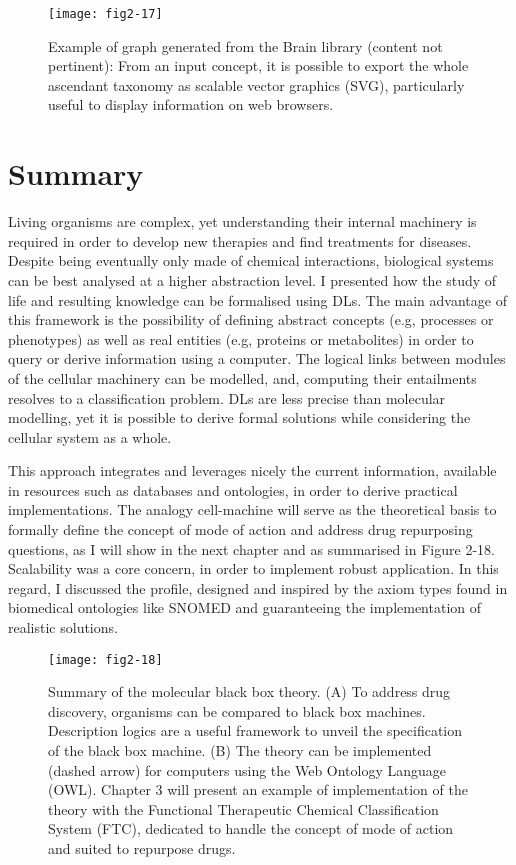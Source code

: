 \begin{figure}[ht]
    \centering
    \texttt{[image: fig2-17]}
    \caption{Example of graph generated from the Brain library (content not pertinent): From an input concept, it is possible to export the whole ascendant taxonomy as scalable vector graphics (SVG), particularly useful to display information on web browsers.}
    \label{fig2-17}
\end{figure}

\section{Summary}

Living organisms are complex, yet understanding their internal machinery is required in order to develop new therapies and find treatments for diseases. Despite being eventually only made of chemical interactions, biological systems can be best analysed at a higher abstraction level. I presented how the study of life and resulting knowledge can be formalised using DLs. The main advantage of this framework is the possibility of defining abstract concepts (e.g, processes or phenotypes) as well as real entities (e.g, proteins or metabolites) in order to query or derive information using a computer. The logical links between modules of the cellular machinery can be modelled, and, computing their entailments resolves to a classification problem. DLs are less precise than molecular modelling, yet it is possible to derive formal solutions while considering the cellular system as a whole.

This approach integrates and leverages nicely the current information, available in resources such as databases and ontologies, in order to derive practical implementations. The analogy cell-machine will serve as the theoretical basis to formally define the concept of mode of action and address drug repurposing questions, as I will show in the next chapter and as summarised in Figure 2-18. Scalability was a core concern, in order to implement robust application. In this regard, I discussed the  profile, designed and inspired by the axiom types found in biomedical ontologies like SNOMED and guaranteeing the implementation of realistic solutions.

\begin{figure}[ht]
    \centering
    \texttt{[image: fig2-18]}
    \caption{Summary of the molecular black box theory. (A) To address drug discovery, organisms can be compared to black box machines. Description logics are a useful framework to unveil the specification of the black box machine. (B) The theory can be implemented (dashed arrow) for computers using the Web Ontology Language (OWL). Chapter 3 will present an example of implementation of the theory with the Functional Therapeutic Chemical Classification System (FTC), dedicated to handle the concept of mode of action and suited to repurpose drugs.}
    \label{fig2-18}
\end{figure}
